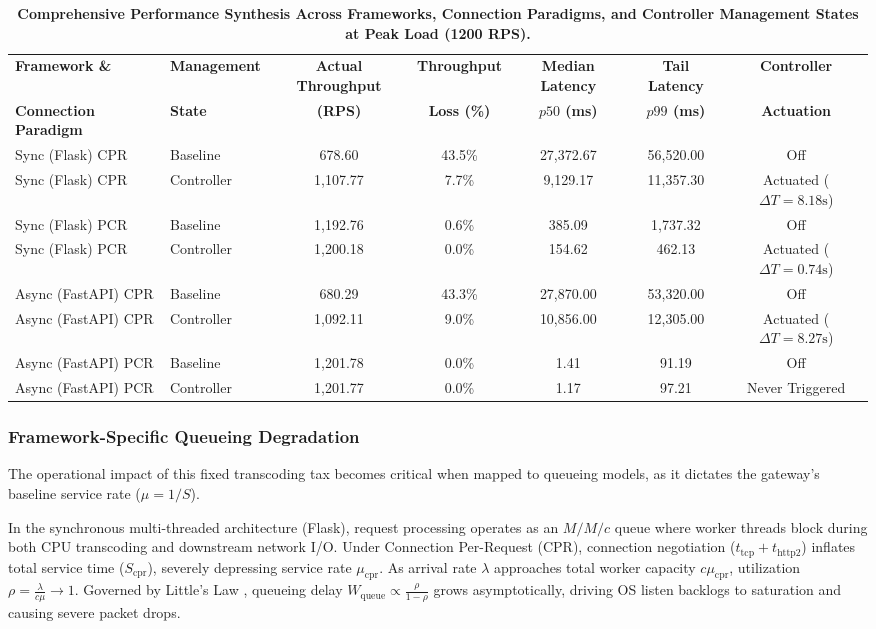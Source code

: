 \documentclass{ieeeaccess}
\begin{document}
	\begin{table}[htbp]
		\centering
		\caption{\textbf{Comprehensive Performance Synthesis Across Frameworks, Connection Paradigms, and Controller Management States at Peak Load (1200 RPS).}}
		\label{tab:master-synthesis}
		\setlength{\tabcolsep}{4pt}
		\begin{tabular}{llccccc}
			\hline
			\textbf{Framework \&} & \textbf{Management} & \textbf{Actual Throughput} & \textbf{Throughput} & \textbf{Median Latency} & \textbf{Tail Latency} & \textbf{Controller} \\
			\textbf{Connection Paradigm} & \textbf{State} & \textbf{(RPS)} & \textbf{Loss (\%)} & \textbf{{$p50$} (ms)} & \textbf{{$p99$} (ms)} & \textbf{Actuation} \\
			\hline
			Sync (Flask) CPR & Baseline & 678.60 & 43.5\% & 27,372.67 & 56,520.00 & Off \\
			Sync (Flask) CPR & Controller & 1,107.77 & 7.7\% & 9,129.17 & 11,357.30 & Actuated ($\Delta T = 8.18\text{s}$) \\
			\hline
			Sync (Flask) PCR & Baseline & 1,192.76 & 0.6\% & 385.09 & 1,737.32 & Off \\
			Sync (Flask) PCR & Controller & 1,200.18 & 0.0\% & 154.62 & 462.13 & Actuated ($\Delta T = 0.74\text{s}$) \\
			\hline
			Async (FastAPI) CPR & Baseline & 680.29 & 43.3\% & 27,870.00 & 53,320.00 & Off \\
			Async (FastAPI) CPR & Controller & 1,092.11 & 9.0\% & 10,856.00 & 12,305.00 & Actuated ($\Delta T = 8.27\text{s}$) \\
			\hline
			Async (FastAPI) PCR & Baseline & 1,201.78 & 0.0\% & 1.41 & 91.19 & Off \\
			Async (FastAPI) PCR & Controller & 1,201.77 & 0.0\% & 1.17 & 97.21 & Never Triggered \\
			\hline
		\end{tabular}
	\end{table}
	
	\subsubsection{Framework-Specific Queueing Degradation}
	The operational impact of this fixed transcoding tax becomes critical when mapped to queueing models, as it dictates the gateway's baseline service rate ($\mu = 1/S$). 
	
	In the synchronous multi-threaded architecture (Flask), request processing operates as an $M/M/c$ queue where worker threads block during both CPU transcoding and downstream network I/O. Under Connection Per-Request (CPR), connection negotiation ($t_{\text{tcp}} + t_{\text{http2}}$) inflates total service time ($S_{\text{cpr}}$), severely depressing service rate $\mu_{\text{cpr}}$. As arrival rate $\lambda$ approaches total worker capacity $c\mu_{\text{cpr}}$, utilization $\rho = \frac{\lambda}{c\mu} \to 1$. Governed by Little's Law \cite{little2011or}, queueing delay $W_{\text{queue}} \propto \frac{\rho}{1-\rho}$ grows asymptotically, driving OS listen backlogs to saturation and causing severe packet drops.
	
\end{document}
